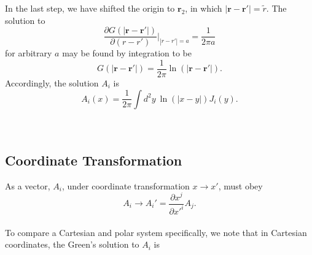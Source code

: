\documentclass[10pt,letterpaper]{article}
\newcommand{\vect}[1]{\mathbf{#1}}
\begin{document}
In the last step, we have shifted the origin to $\vect r_2$, in which $|\vect r-\vect r'| = \tilde r$. The solution to
\begin{equation}
 \frac{\partial G(|\vect r-\vect r'|)}{\partial (r-r')}\bigg|_{|r-r'| =a} =\frac{1}{2\pi a}
\end{equation}
for arbitrary $a$ may be found by integration to be
\begin{equation}
G(|\vect r-\vect r'|) = \frac{1}{2\pi} \ln (|\vect r-\vect r'|).
\end{equation}
Accordingly, the solution $A_i$ is 
\begin{equation}
A_i(x) = \frac{1}{2\pi} \int d^2y\ \ln(|x- y|) J_i(y).
\end{equation}
\\ \\
\subsection{Coordinate Transformation}
As a vector, $A_i$, under coordinate transformation $x\to x'$, must obey
\begin{equation}
A_i \to A_i' = \frac{\partial x^j}{\partial x'^i}A_j\label{26}.
\end{equation}
\\ 
To compare a Cartesian and polar system specifically, we note that in Cartesian coordinates, the Green's solution to $A_i$ is
\end{document}
